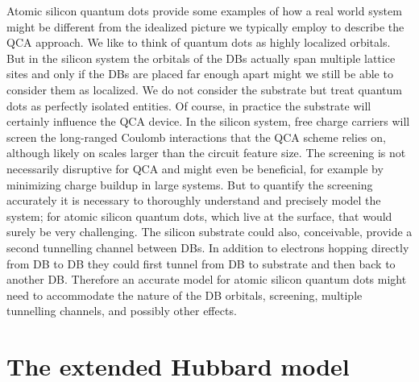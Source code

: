 Atomic silicon quantum dots provide some examples of how a real world system
might be different from the idealized picture we typically employ to describe
the QCA approach. We like to think of quantum dots as highly localized orbitals.
But in the silicon system the orbitals of the DBs actually span multiple lattice
sites and only if the DBs are placed far enough apart might we still be able to
consider them as localized. We do not consider the substrate but treat quantum
dots as perfectly isolated entities. Of course, in practice the substrate will
certainly influence the QCA device. In the silicon system, free charge carriers
will screen the long-ranged Coulomb interactions that the QCA scheme relies on,
although likely on scales larger than the circuit feature size. The screening is
not necessarily disruptive for QCA and might even be beneficial, for example by
minimizing charge buildup in large systems. But to quantify the screening
accurately it is necessary to thoroughly understand and precisely model the
system; for atomic silicon quantum dots, which live at the surface, that would
surely be very challenging. The silicon substrate could also, conceivable,
provide a second tunnelling channel between DBs. In addition to electrons
hopping directly from DB to DB they could first tunnel from DB to substrate and
then back to another DB.  Therefore an accurate model for atomic silicon quantum
dots might need to accommodate the nature of the DB orbitals, screening,
multiple tunnelling channels, and possibly other effects.


\section{The extended Hubbard model}

